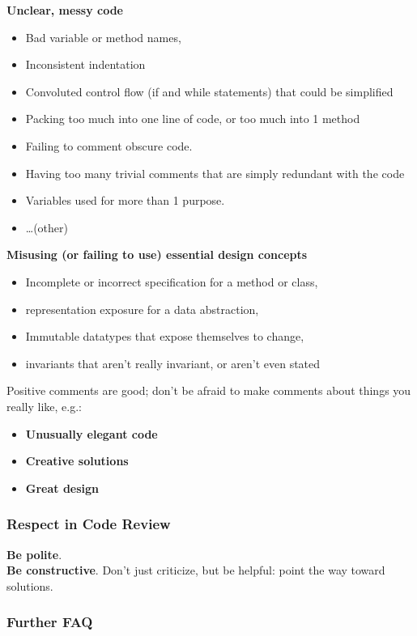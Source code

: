 \documentclass[10pt]{amsart}
\begin{document}
\textbf{Unclear, messy code}
\begin{itemize}
	\item Bad variable or method names, 
	\item Inconsistent indentation
	\item Convoluted control flow (if and while statements) that could be simplified
	\item Packing too much into one line of code, or too much into 1 method
	\item Failing to comment obscure code.
	\item Having too many trivial comments that are simply redundant with the code
	\item Variables used for more than 1 purpose.
	\item \dots (other)
\end{itemize}

\textbf{Misusing (or failing to use) essential design concepts}
\begin{itemize}
	\item Incomplete or incorrect specification for a method or class,
	\item representation exposure for a data abstraction,
	\item Immutable datatypes that expose themselves to change,
	\item invariants that aren't really invariant, or aren't even stated
\end{itemize}

Positive comments are good; don't be afraid to make comments about things you really like, e.g.:
\begin{itemize}
	\item \textbf{Unusually elegant code}
	\item \textbf{Creative solutions}
	\item \textbf{Great design}
\end{itemize}

\subsubsection{Respect in Code Review}
\textbf{Be polite}. \\
\textbf{Be constructive}. Don't just criticize, but be helpful: point the way toward solutions.

\subsubsection{Further FAQ}
\end{document}
